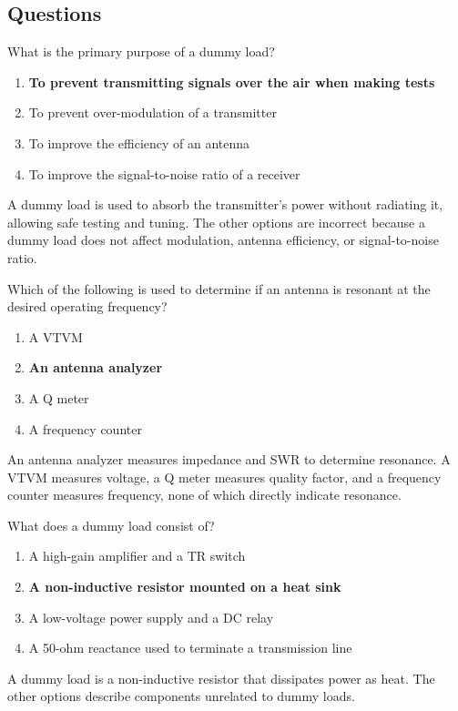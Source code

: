 \subsection*{Questions}
\begin{tcolorbox}[colback=gray!10!white,colframe=black!75!black,title={T7C01}]
    What is the primary purpose of a dummy load?
    \begin{enumerate}[label=\Alph*),noitemsep]
        \item \textbf{To prevent transmitting signals over the air when making tests}
        \item To prevent over-modulation of a transmitter
        \item To improve the efficiency of an antenna
        \item To improve the signal-to-noise ratio of a receiver
    \end{enumerate}
\end{tcolorbox}
A dummy load is used to absorb the transmitter's power without radiating it, allowing safe testing and tuning. The other options are incorrect because a dummy load does not affect modulation, antenna efficiency, or signal-to-noise ratio.


\begin{tcolorbox}[colback=gray!10!white,colframe=black!75!black,title={T7C02}]
    Which of the following is used to determine if an antenna is resonant at the desired operating frequency?
    \begin{enumerate}[label=\Alph*),noitemsep]
        \item A VTVM
        \item \textbf{An antenna analyzer}
        \item A Q meter
        \item A frequency counter
    \end{enumerate}
\end{tcolorbox}
An antenna analyzer measures impedance and SWR to determine resonance. A VTVM measures voltage, a Q meter measures quality factor, and a frequency counter measures frequency, none of which directly indicate resonance.


\begin{tcolorbox}[colback=gray!10!white,colframe=black!75!black,title={T7C03}]
    What does a dummy load consist of?
    \begin{enumerate}[label=\Alph*),noitemsep]
        \item A high-gain amplifier and a TR switch
        \item \textbf{A non-inductive resistor mounted on a heat sink}
        \item A low-voltage power supply and a DC relay
        \item A 50-ohm reactance used to terminate a transmission line
    \end{enumerate}
\end{tcolorbox}
A dummy load is a non-inductive resistor that dissipates power as heat. The other options describe components unrelated to dummy loads.

